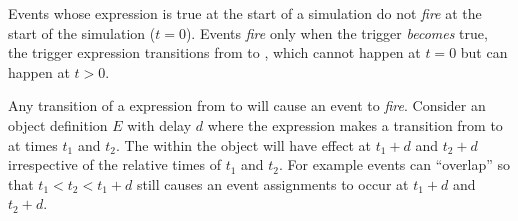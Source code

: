 Events whose  expression is true at the start of a
simulation do not \emph{fire} at the start of the simulation ($t =
0$).  Events \emph{fire} only when the trigger \emph{becomes}
true, \ie the trigger expression transitions from  to
, which cannot happen at $t = 0$ but can happen at $t >
0$.

Any transition of a  expression from  to
 will cause an event to \emph{fire}.  Consider an \Event
object definition $E$ with delay $d$ where the 
expression makes a transition from  to  at
times $t_1$ and $t_2$.  The \EventAssignment within the \Event
object will have effect at $t_1+d$ and $t_2+d$ irrespective of the
relative times of $t_1$ and $t_2$. For example events can
``overlap'' so that $t_1 < t_2 < t_1+d$ still causes an event
assignments to occur at $t_1+d$ and $t_2+d$.

